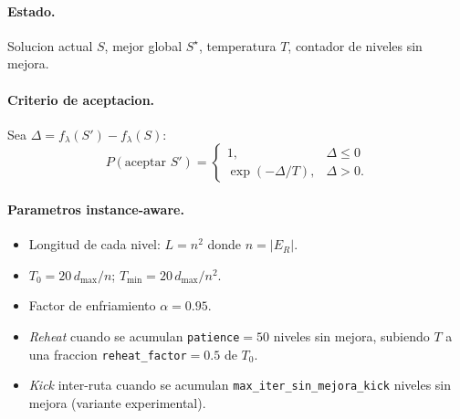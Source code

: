 \documentclass[11pt,a4paper]{article}
\newcommand{\code}[1]{\texttt{#1}}
\begin{document}
\paragraph{Estado.} Solucion actual $S$, mejor global $S^\star$,
temperatura $T$, contador de niveles sin mejora.

\paragraph{Criterio de aceptacion.} Sea $\Delta=f_\lambda(S')-f_\lambda(S)$:
\begin{equation}
P(\text{aceptar } S') =
\begin{cases}
1, & \Delta\le 0 \\
\exp(-\Delta/T), & \Delta > 0.
\end{cases}
\end{equation}

\paragraph{Parametros instance-aware.}
\begin{itemize}
\item Longitud de cada nivel: $L=n^2$ donde $n=|E_R|$.
\item $T_0 = 20\,d_{\max}/n$;\; $T_{\min}=20\,d_{\max}/n^2$.
\item Factor de enfriamiento $\alpha=0.95$.
\item \emph{Reheat} cuando se acumulan \code{patience}$=50$ niveles
sin mejora, subiendo $T$ a una fraccion \code{reheat\_factor}$=0.5$
de $T_0$.
\item \emph{Kick} inter-ruta cuando se acumulan
\code{max\_iter\_sin\_mejora\_kick} niveles sin mejora (variante
experimental).
\end{itemize}
\end{document}

